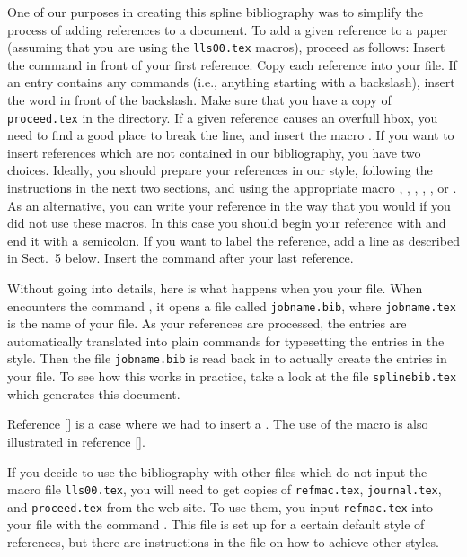 One of our purposes in creating this spline bibliography was to
simplify the process of adding references to a \Tex document.
To add a given reference to a paper (assuming that you
are using the {\tt lls00.tex} macros), proceed as follows:
\sm
{} Insert the command  in front of your
first reference.
\sm
{} Copy each reference into your \Tex file.
\sm
{} If an entry contains any \Tex commands (i.e.,
anything starting with a backslash), insert the word
 in front of the backslash.
\sm
{} Make sure that you have a copy of {\tt proceed.tex}
in the directory.
\sm
{} If a given reference causes an overfull hbox, you
need to find a good place to break the line, and insert the
macro .
\sm
{} If you want to insert references which are not
contained in our bibliography, you have two choices.  Ideally,
you should prepare your references in our style,
following the instructions in the next two sections,
and using the appropriate macro , , ,
, , or .
As an alternative, you can
write your reference in the way that you would if you did
not use these macros. In this case you should begin your
reference with  and end it with a semicolon.
\sm
{} If you want to label the reference, add a line
as described in Sect.~5 below.
 Insert the command  after your last
reference.
\ms

Without going into details, here is what happens when you
\Tex your file.   When \Tex encounters the command ,
it opens a file called {\tt jobname.bib}, where {\tt jobname.tex}
is the name of your \Tex file.	As your references are processed,
the entries are automatically translated into plain \Tex commands
for typesetting the entries in the \conf style.
Then the file {\tt jobname.bib} is read back in
to actually create the entries in your \Tex file.
To see how this works in practice, take a look at the file
{\tt splinebib.tex} which generates this document.

Reference [] is a case where we	had to insert
a .  The use of the macro 
is also illustrated in reference [].

If you decide to use the bibliography with other \Tex files
which do not input the macro file {\tt lls00.tex},
you will need to get copies of
{\tt refmac.tex}, {\tt journal.tex}, and {\tt proceed.tex}
from the web site. To use them, you input {\tt refmac.tex}
into your \Tex file with the command .
This file is set up for a certain default style of references, but
there are instructions in the file on how to achieve other styles.


